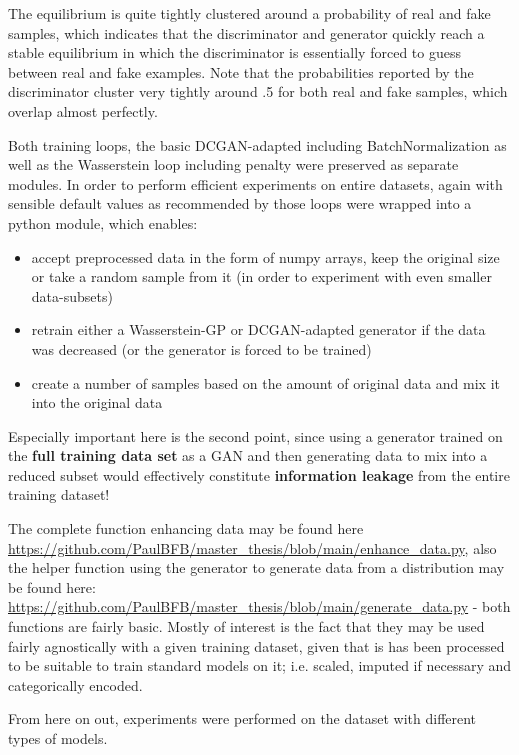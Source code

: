 The equilibrium is quite tightly clustered around a probability of real and fake samples, which indicates that the discriminator and generator quickly reach a stable equilibrium 
in which the discriminator is essentially forced to guess between real and fake examples. Note that the probabilities reported by the discriminator cluster very tightly around .5 for both real and fake samples, which overlap almost perfectly.

\pagebreak

Both training loops, the basic DCGAN-adapted including BatchNormalization as well as the Wasserstein loop including penalty were preserved as separate modules. 
In order to perform efficient experiments on entire datasets, again with sensible default values as recommended by \cite{buitinck2013api} those loops were wrapped into a python module, which enables:

\begin{itemize}
	\item accept preprocessed data in the form of numpy arrays, keep the original size or take a random sample from it (in order to experiment with even smaller data-subsets)
	\item retrain either a Wasserstein-GP or DCGAN-adapted generator if the data was decreased (or the generator is forced to be trained)
	\item create a number of samples based on the amount of original data and mix it into the original data
\end{itemize}

Especially important here is the second point, since using a generator trained on the \textbf{full training data set} as a \ac{GAN} and then generating data to mix into a reduced subset 
would effectively constitute \textbf{information leakage} from the entire training dataset!

The complete function enhancing data may be found here \url{https://github.com/PaulBFB/master_thesis/blob/main/enhance_data.py}, also the helper function using the generator to generate data from a distribution may be found here: \url{https://github.com/PaulBFB/master_thesis/blob/main/generate_data.py} - both functions are fairly basic. 
Mostly of interest is the fact that they may be used fairly agnostically with a given training dataset, given that is has been processed to be suitable to train standard models on it; i.e. scaled, imputed if necessary and categorically encoded.

From here on out, experiments were performed on the dataset with different types of models.

